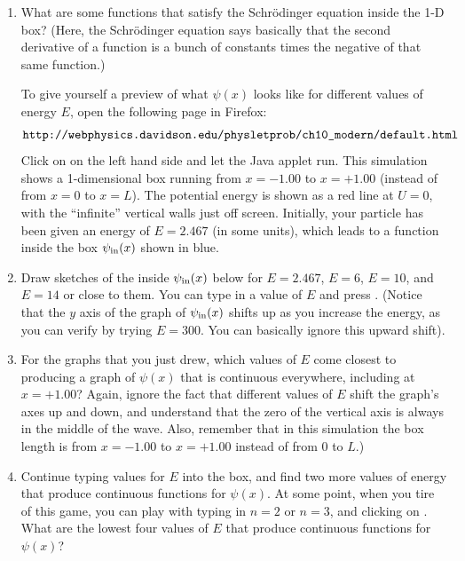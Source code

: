 \begin{enumerate}

\item What are some functions that satisfy the Schrödinger equation inside the 1-D box? (Here, the
Schr\"odinger equation says basically that the second derivative of a function is a bunch of constants times the negative of that same function.)
\answerspace{0.8in}

To give yourself a preview of what $\psi(x)$ looks like for different values of energy $E$, open the
following page in Firefox:
$$\verb!http://webphysics.davidson.edu/physletprob/ch10_modern/default.html!$$
Click on  on the left hand side and let the Java applet run. This simulation shows a 1-dimensional box running from $x =-1.00$ to $x=+1.00$ (instead of from $x=0$ to $x=L$). The potential energy is shown as a red line at $U=0$, with the ``infinite'' vertical walls just off screen. Initially, your particle has been given an energy of $E=2.467$ (in some units), which leads to a function inside the box $\psi_{\rm in}(x)$ shown in blue. 

\item Draw sketches of the inside $\psi_{\rm in}(x)$ below for $E=2.467$, $E=6$, $E=10$, and $E=14$ or close to them.  You can type in a value of $E$ and press .  (Notice that the $y$ axis of the graph of  $\psi_{\rm in}(x)$ shifts up as you increase the energy, as you can verify by trying $E=300$.  You can basically ignore this upward shift).
\answerspace{1.6in}

\item For the graphs that you just drew, 
which values of $E$ come closest to producing a graph of $\psi(x)$ that is continuous everywhere, including at $x =+1.00$? Again, ignore the fact that different values of $E$ shift the graph's axes up and down, and understand that the zero of the vertical axis is always in the middle of the wave.  Also, remember that in this simulation the box length is from 
$x =-1.00$ to $x=+1.00$ instead of from 0 to $L$.)
\answerspace{0.3in}
\pagebreak[3]

\item Continue typing values for $E$ into the box, and find two more values of energy that produce continuous functions for $\psi(x)$.  At some point, when you tire of this game, you can play with typing in $n=2$ or $n=3$, and clicking on . What are the lowest four values of $E$ that produce continuous functions for $\psi(x)$?
\answerspace{0.3in}


\end{enumerate}
